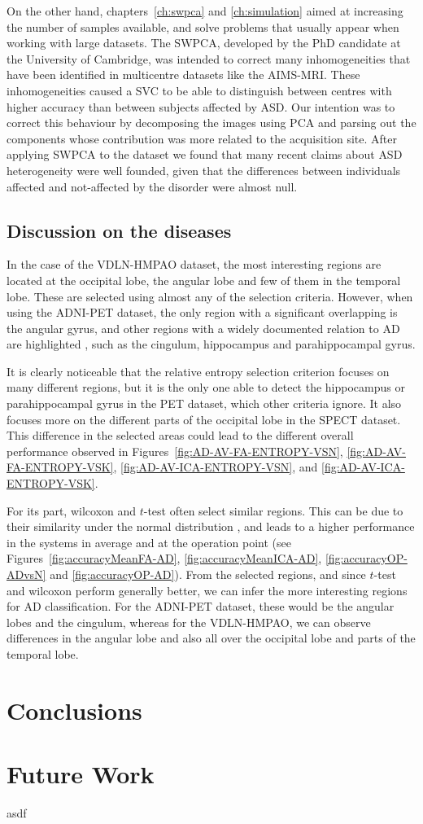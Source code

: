 On the other hand, chapters~\ref{ch:swpca} and \ref{ch:simulation} aimed at increasing the number of samples available, and solve problems that usually appear when working with large datasets. The \ac{SWPCA}, developed by the PhD candidate at the University of Cambridge, was intended to correct many inhomogeneities that have been identified in multicentre datasets like the AIMS-MRI. These inhomogeneities caused a \ac{SVC} to be able to distinguish between centres with higher accuracy than between subjects affected by \ac{ASD}. Our intention was to correct this behaviour by decomposing the images using \ac{PCA} and parsing out the components whose contribution was more related to the acquisition site. After applying \ac{SWPCA} to the dataset we found that many recent claims about \ac{ASD} heterogeneity \cite{haar2014anatomical} were well founded, given that the differences between individuals affected and not-affected by the disorder were almost null. 


\subsection{Discussion on the diseases}
In the case of the VDLN-HMPAO dataset, the most interesting regions are located at the occipital lobe, the angular lobe and few of them in the temporal lobe. These are selected using almost any of the selection criteria. However, when using the ADNI-PET dataset, the only region with a significant overlapping is the angular gyrus, and other regions with a widely documented relation to \ac{AD} are highlighted \cite{Dubois2007,Claus1994}, such as the cingulum, hippocampus and parahippocampal gyrus. 

It is clearly noticeable that the relative entropy selection criterion focuses on many different regions, but it is the only one able to detect the hippocampus or parahippocampal gyrus in the \ac{PET} dataset, which other criteria ignore. It also focuses more on the different parts of the occipital lobe in the \ac{SPECT} dataset. This difference in the selected areas could lead to the different overall performance observed in Figures~\ref{fig:AD-AV-FA-ENTROPY-VSN}, \ref{fig:AD-AV-FA-ENTROPY-VSK}, \ref{fig:AD-AV-ICA-ENTROPY-VSN}, and \ref{fig:AD-AV-ICA-ENTROPY-VSK}.

For its part, wilcoxon and $t$-test often select similar regions. This can be due to their similarity under the normal distribution \cite{Fay10}, and leads to a higher performance in the systems in average and at the operation point (see Figures~\ref{fig:accuracyMeanFA-AD}, \ref{fig:accuracyMeanICA-AD}, \ref{fig:accuracyOP-ADvsN} and \ref{fig:accuracyOP-AD}). From the selected regions, and since $t$-test and wilcoxon perform generally better, we can infer the more interesting regions for \ac{AD} classification. For the ADNI-PET dataset, these would be the angular lobes and the cingulum, whereas for the VDLN-HMPAO, we can observe differences in the angular lobe and also all over the occipital lobe and parts of the temporal lobe. 
\section{Conclusions}

\section{Future Work}


asdf